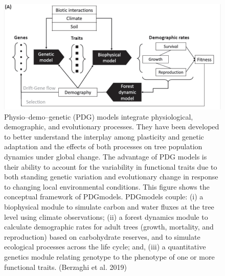 \documentclass[12pt,oneside]{book}
\begin{document}
\begin{figure}

{\centering \includegraphics[width=0.8\linewidth]{figures/chap7/f718_berzaghi} 

}

\caption{Physio–demo–genetic (PDG) models integrate physiological, demographic, and evolutionary processes. They have been developed to better understand the interplay among plasticity and genetic adaptation and the effects of both processes on tree population dynamics under global change. The advantage of PDG models is their ability to account for the variability in functional traits due to both standing genetic variation and evolutionary change in response to changing local environmental conditions. This figure shows the conceptual framework of PDGmodels. PDGmodels couple: (i) a biophysical module to simulate carbon and water fluxes at the tree level using climate observations; (ii) a forest dynamics module to calculate demographic rates for adult trees (growth, mortality, and reproduction) based on carbohydrate reserves, and to simulate ecological processes across the life cycle; and, (iii) a quantitative genetics module relating genotype to the phenotype of one or more functional traits. (Berzaghi et al. 2019)}\label{fig:f718}
\end{figure}
\end{document}
